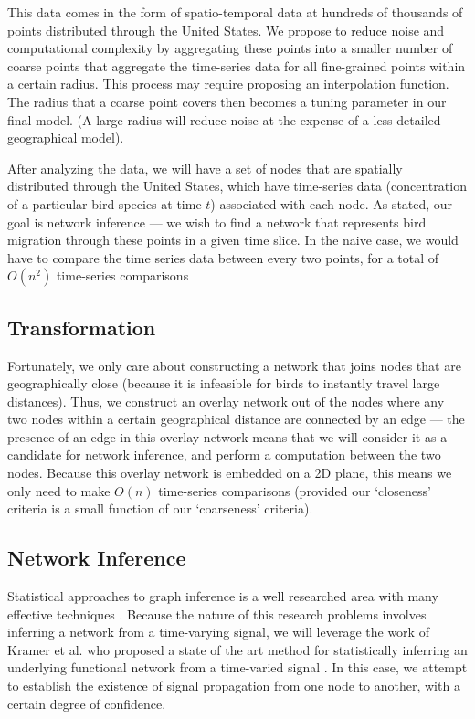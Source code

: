 \documentclass[11pt]{sigplanconf}
\begin{document}
This data comes in the form of spatio-temporal data at hundreds of thousands of points distributed through the United States. We propose to reduce noise and computational complexity by aggregating these points into a smaller number of coarse points that aggregate the time-series data for all fine-grained points within a certain radius. This process may require proposing an interpolation function. The radius that a coarse point covers then becomes a tuning parameter in our final model. (A large radius will reduce noise at the expense of a less-detailed geographical model). 

After analyzing the data, we will have a set of nodes that are spatially distributed through the United States, which have time-series data (concentration of a particular bird species at time $t$) associated with each node. As stated, our goal is network inference --- we wish to find a network that represents bird migration through these points in a given time slice. In the naive case, we would have to compare the time series data between every two points, for a total of $O(n^2)$ time-series comparisons

\subsection{Transformation}
Fortunately, we only care about constructing a network that joins nodes that are geographically close (because it is infeasible for birds to instantly travel large distances). Thus, we construct an overlay network out of the nodes where any two nodes within a certain geographical distance are connected by an edge --- the presence of an edge in this overlay network means that we will consider it as a candidate for network inference, and perform a computation between the two nodes. Because this overlay network is embedded on a 2D plane, this means we only need to make $O(n)$ time-series comparisons (provided our `closeness' criteria is a small function of our `coarseness' criteria). 

\subsection{Network Inference} 
Statistical approaches to graph inference is a well researched area with many effective techniques \cite{AlbertMechanics}. Because the nature of this research problems involves inferring a network from a time-varying signal, we will leverage the work of Kramer et al. who proposed a state of the art method for statistically inferring an underlying functional network from a time-varied signal \cite{kramer}. In this case, we attempt to establish the existence of signal propagation from one node to another, with a certain degree of confidence. 
\end{document}
